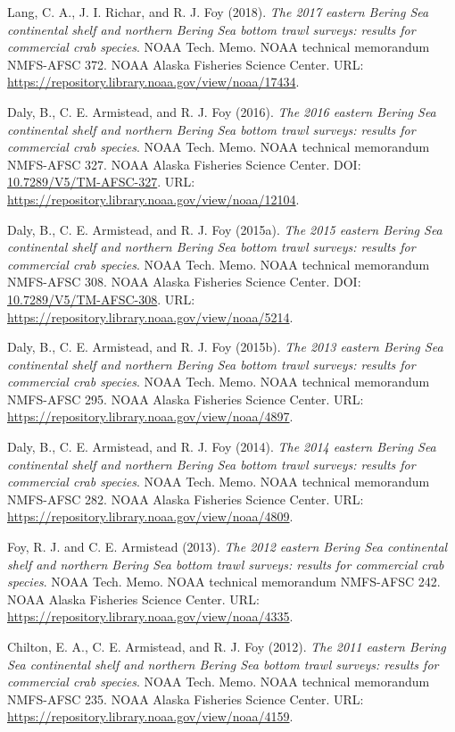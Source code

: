 \documentclass[
  letterpaper,
  oneside,
  open=any]{scrbook}
\begin{document}
Lang, C. A., J. I. Richar, and R. J. Foy (2018). \emph{The 2017 eastern
Bering Sea continental shelf and northern Bering Sea bottom trawl
surveys: results for commercial crab species}. NOAA Tech. Memo. NOAA
technical memorandum NMFS-AFSC 372. NOAA Alaska Fisheries Science
Center. URL: \url{https://repository.library.noaa.gov/view/noaa/17434}.

Daly, B., C. E. Armistead, and R. J. Foy (2016). \emph{The 2016 eastern
Bering Sea continental shelf and northern Bering Sea bottom trawl
surveys: results for commercial crab species}. NOAA Tech. Memo. NOAA
technical memorandum NMFS-AFSC 327. NOAA Alaska Fisheries Science
Center. DOI:
\href{https://doi.org/10.7289\%2FV5\%2FTM-AFSC-327}{10.7289/V5/TM-AFSC-327}.
URL: \url{https://repository.library.noaa.gov/view/noaa/12104}.

Daly, B., C. E. Armistead, and R. J. Foy (2015a). \emph{The 2015 eastern
Bering Sea continental shelf and northern Bering Sea bottom trawl
surveys: results for commercial crab species}. NOAA Tech. Memo. NOAA
technical memorandum NMFS-AFSC 308. NOAA Alaska Fisheries Science
Center. DOI:
\href{https://doi.org/10.7289\%2FV5\%2FTM-AFSC-308}{10.7289/V5/TM-AFSC-308}.
URL: \url{https://repository.library.noaa.gov/view/noaa/5214}.

Daly, B., C. E. Armistead, and R. J. Foy (2015b). \emph{The 2013 eastern
Bering Sea continental shelf and northern Bering Sea bottom trawl
surveys: results for commercial crab species}. NOAA Tech. Memo. NOAA
technical memorandum NMFS-AFSC 295. NOAA Alaska Fisheries Science
Center. URL: \url{https://repository.library.noaa.gov/view/noaa/4897}.

Daly, B., C. E. Armistead, and R. J. Foy (2014). \emph{The 2014 eastern
Bering Sea continental shelf and northern Bering Sea bottom trawl
surveys: results for commercial crab species}. NOAA Tech. Memo. NOAA
technical memorandum NMFS-AFSC 282. NOAA Alaska Fisheries Science
Center. URL: \url{https://repository.library.noaa.gov/view/noaa/4809}.

Foy, R. J. and C. E. Armistead (2013). \emph{The 2012 eastern Bering Sea
continental shelf and northern Bering Sea bottom trawl surveys: results
for commercial crab species}. NOAA Tech. Memo. NOAA technical memorandum
NMFS-AFSC 242. NOAA Alaska Fisheries Science Center. URL:
\url{https://repository.library.noaa.gov/view/noaa/4335}.

Chilton, E. A., C. E. Armistead, and R. J. Foy (2012). \emph{The 2011
eastern Bering Sea continental shelf and northern Bering Sea bottom
trawl surveys: results for commercial crab species}. NOAA Tech. Memo.
NOAA technical memorandum NMFS-AFSC 235. NOAA Alaska Fisheries Science
Center. URL: \url{https://repository.library.noaa.gov/view/noaa/4159}.
\end{document}
